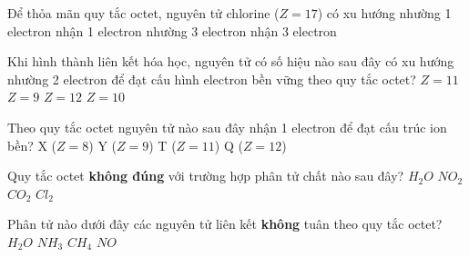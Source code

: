 \begin{ex}
	Để thỏa mãn quy tắc octet, nguyên tử chlorine ($Z=17$) có xu hướng
	\choice
	{nhường 1 electron}
	{\True nhận 1 electron}
	{nhường 3 electron}
	{nhận 3 electron}
	\loigiai{}
\end{ex}

\begin{ex}
	Khi hình thành liên kết hóa học, nguyên tử có số hiệu nào sau đây có xu hướng nhường 2 electron để đạt
	cấu hình electron bền vững theo quy tắc octet?
	\choice
	{$Z=11$}
	{$Z=9$}
	{\True $Z=12$}
	{$Z=10$}
	\loigiai{}
\end{ex}

\begin{ex}
	Theo quy tắc octet nguyên tử nào sau đây nhận 1 electron để đạt cấu trúc ion bền?
	\choice
	{X ($Z=8$)}
	{\True Y ($Z=9$)}
	{T ($Z=11$)}
	{Q ($Z=12$)}
	\loigiai{}
\end{ex}

\begin{ex}
	Quy tắc octet \textbf{không đúng} với trường hợp phân tử chất nào sau đây?
	\choice
	{$H_2O$}
	{\True$NO_2$}
	{$CO_2$}
	{$Cl_2$}
	\loigiai{}
\end{ex}

\begin{ex}
	Phân tử nào dưới đây các nguyên tử liên kết \textbf{không} tuân theo quy tắc octet?
	\choice
	{$H_2O$}
	{$NH_3$}
	{$CH_4$}
	{\True $NO$}
	\loigiai{}
\end{ex}

